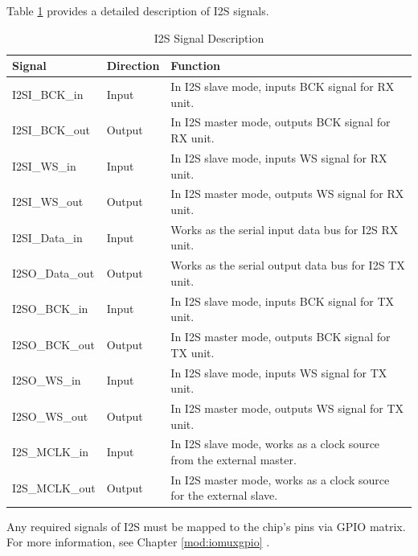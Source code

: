 \documentclass[main\_\_EN.tex]{subfiles}
\begin{document}
Table \ref{tab:i2s-signal-descr} provides a detailed description of I2S signals.


\begin{table}[H]
    \centering
    \caption{I2S Signal Description}
    \label{tab:i2s-signal-descr}
    \begin{tabular}{|p{2.8cm}|p{1.8cm}|p{10.2cm}| }
    \hline
    \rowcolor{lightgray}
    \textbf{Signal} & \textbf{Direction} & \textbf{Function} \\
    \hline
    I2SI\_BCK\_in  & Input & In I2S slave mode, inputs BCK signal for RX unit. \\
    \hline
    I2SI\_BCK\_out& Output & In I2S master mode, outputs BCK signal for RX unit. \\
    \hline
    I2SI\_WS\_in & Input & In I2S slave mode, inputs WS signal for RX unit. \\
    \hline
    I2SI\_WS\_out& Output & In I2S master mode, outputs WS signal for RX unit. \\\hline
    I2SI\_Data\_in& Input & Works as the serial input data bus for I2S RX unit.\\\hline
    I2SO\_Data\_out& Output & Works as the serial output data bus for I2S TX unit.\\\hline
    
    I2SO\_BCK\_in&  Input & In I2S slave mode, inputs BCK signal for TX unit. \\\hline
    I2SO\_BCK\_out&  Output & In I2S master mode, outputs BCK signal for TX unit. \\\hline
    I2SO\_WS\_in&  Input & In I2S slave mode, inputs WS signal for TX unit. \\\hline
    I2SO\_WS\_out& Output & In I2S master mode, outputs WS signal for TX unit. \\\hline
    I2S\_MCLK\_in& Input & In I2S slave mode, works as a clock source from the external master.\\\hline
    I2S\_MCLK\_out& Output & In I2S master mode, works as a clock source for the external slave. \\\hline
    \end{tabular}
\end{table}

\vspace{-0.5em}
\begin{tiplisting}
Any required signals of I2S must be mapped to the chip's pins via GPIO matrix. For more information, see Chapter \ref{mod:iomuxgpio} \textit{}.
\end{tiplisting}
\end{document}
